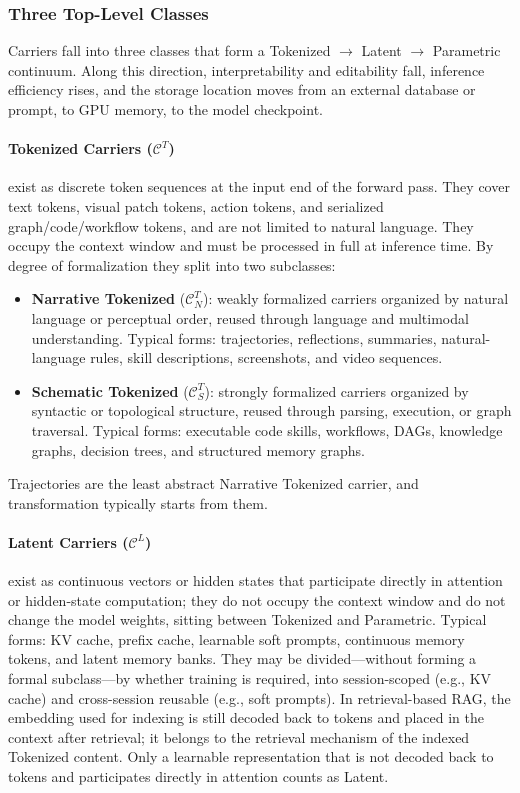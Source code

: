\subsubsection{Three Top-Level Classes}
\label{sec:carrier-classes}

Carriers fall into three classes that form a Tokenized $\rightarrow$ Latent $\rightarrow$ Parametric continuum. Along this direction, interpretability and editability fall, inference efficiency rises, and the storage location moves from an external database or prompt, to GPU memory, to the model checkpoint.

\paragraph{Tokenized Carriers ($\mathcal{C}^T$)} exist as discrete token sequences at the input end of the forward pass. They cover text tokens, visual patch tokens, action tokens, and serialized graph/code/workflow tokens, and are not limited to natural language. They occupy the context window and must be processed in full at inference time. By degree of formalization they split into two subclasses:
\begin{itemize}
  \item \textbf{Narrative Tokenized} ($\mathcal{C}^T_N$): weakly formalized carriers organized by natural language or perceptual order, reused through language and multimodal understanding. Typical forms: trajectories, reflections, summaries, natural-language rules, skill descriptions, screenshots, and video sequences.
  \item \textbf{Schematic Tokenized} ($\mathcal{C}^T_S$): strongly formalized carriers organized by syntactic or topological structure, reused through parsing, execution, or graph traversal. Typical forms: executable code skills, workflows, DAGs, knowledge graphs, decision trees, and structured memory graphs.
\end{itemize}
Trajectories are the least abstract Narrative Tokenized carrier, and transformation typically starts from them.

\paragraph{Latent Carriers ($\mathcal{C}^L$)} exist as continuous vectors or hidden states that participate directly in attention or hidden-state computation; they do not occupy the context window and do not change the model weights, sitting between Tokenized and Parametric. Typical forms: KV cache, prefix cache, learnable soft prompts, continuous memory tokens, and latent memory banks. They may be divided---without forming a formal subclass---by whether training is required, into session-scoped (e.g., KV cache) and cross-session reusable (e.g., soft prompts). In retrieval-based RAG, the embedding used for indexing is still decoded back to tokens and placed in the context after retrieval; it belongs to the retrieval mechanism of the indexed Tokenized content. Only a learnable representation that is not decoded back to tokens and participates directly in attention counts as Latent.

